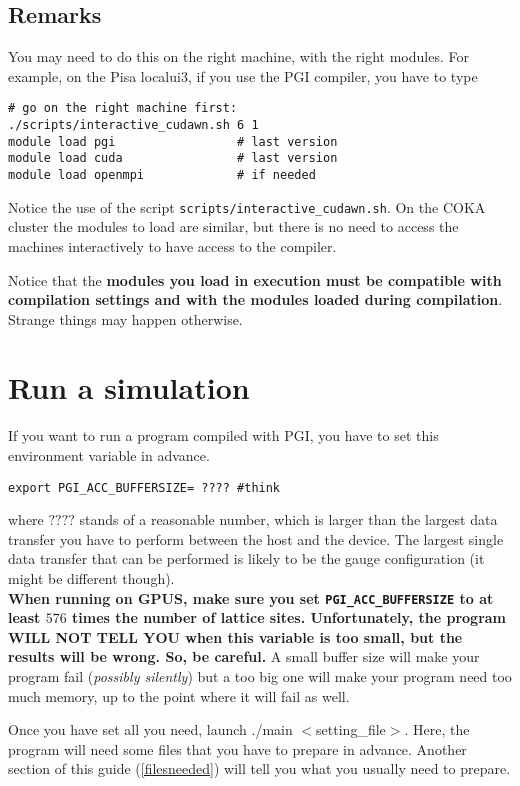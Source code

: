 \subsection{Remarks} 
You may need to do this on the right machine, with the right modules.
For example, on the Pisa localui3, if you use the PGI compiler,
you have to type
\begin{verbatim}
# go on the right machine first:
./scripts/interactive_cudawn.sh 6 1
module load pgi                 # last version
module load cuda                # last version
module load openmpi             # if needed 
\end{verbatim}
Notice the use of the script \verb|scripts/interactive_cudawn.sh|.
On the COKA cluster the modules to load are similar, but there is no need to access
the machines interactively to have access to the compiler.

Notice that the { \bfseries modules you load in execution must be compatible 
with compilation settings and with the modules loaded during compilation}.
Strange things may happen otherwise.

\section{Run a simulation}

If you want to run a program compiled with PGI, you have to set this 
environment variable in advance.
\begin{verbatim}
export PGI_ACC_BUFFERSIZE= ???? #think
\end{verbatim}
where $????$ stands of a reasonable number, which is larger than the largest 
data transfer you have to perform between the host and the device. The largest 
single data transfer that can be performed is likely to be the gauge 
configuration (it might be different though). \\
{ \bfseries When running on GPUS, make sure you set \verb|PGI_ACC_BUFFERSIZE| to at 
    least $576$ times the number of lattice sites. Unfortunately, the program WILL 
    NOT TELL YOU when this variable is too small, but the results will be wrong. 
So, be careful.}
A small buffer size will make your program fail (\emph{possibly silently}) 
but a too big one will make your program need too much memory, up to the point 
where it will fail as well.


Once you have set all you need, launch 
\textsf{ ./main $<$setting\_file$>$}. Here, the program 
will  need some  files that you have to prepare in advance. Another section
of this guide (\ref{filesneeded}) will tell you what you usually need to 
prepare.

